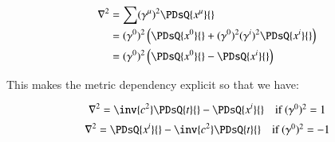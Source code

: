 \begin{align*}
\grad^2
&= \sum (\gamma^{\mu})^2 \PDsQ{x^{\mu}}{} \\
&= (\gamma^0)^2 \left( \PDsQ{x^0}{} + (\gamma^0)^2 (\gamma^i)^2 \PDsQ{x^i}{} \right) \\
&= (\gamma^0)^2 \left( \PDsQ{x^0}{} - \PDsQ{x^i}{} \right)
\end{align*}

This makes the metric dependency explicit so that we have:

\begin{equation*}
\grad^2 = \inv{c^2} \PDsQ{t}{} - \PDsQ{x^i}{} \quad \mbox{if $(\gamma^0)^2 = 1$}
\end{equation*}
\begin{equation*}
\grad^2 = \PDsQ{x^i}{} - \inv{c^2} \PDsQ{t}{} \quad \mbox{if $(\gamma^0)^2 = -1$}
\end{equation*}
